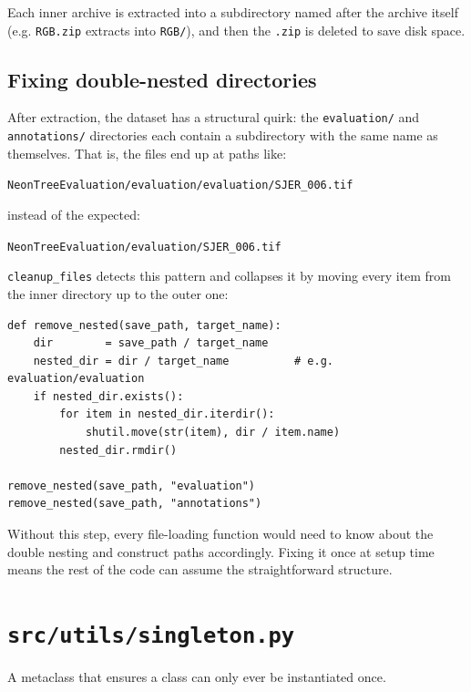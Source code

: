 \documentclass[11pt, a4paper]{article}
\newenvironment{filebox}[1]{%
  \begin{tcolorbox}[
    colback=filebg, colframe=fileframe,
    fonttitle=\bfseries\ttfamily, title=#1,
    breakable, enhanced
  ]
}{%
  \end{tcolorbox}
}
\begin{document}
Each inner archive is extracted into a subdirectory named after the archive
itself (e.g. \texttt{RGB.zip} extracts into \texttt{RGB/}), and then the
\texttt{.zip} is deleted to save disk space.

\subsection{Fixing double-nested directories}

After extraction, the dataset has a structural quirk: the
\texttt{evaluation/} and \texttt{annotations/} directories each contain a
subdirectory with the same name as themselves. That is, the files end up at
paths like:

\begin{center}
  \texttt{NeonTreeEvaluation/evaluation/evaluation/SJER\_006.tif}
\end{center}

instead of the expected:

\begin{center}
  \texttt{NeonTreeEvaluation/evaluation/SJER\_006.tif}
\end{center}

\texttt{cleanup\_files} detects this pattern and collapses it by moving every
item from the inner directory up to the outer one:

\begin{lstlisting}
def remove_nested(save_path, target_name):
    dir        = save_path / target_name
    nested_dir = dir / target_name          # e.g. evaluation/evaluation
    if nested_dir.exists():
        for item in nested_dir.iterdir():
            shutil.move(str(item), dir / item.name)
        nested_dir.rmdir()

remove_nested(save_path, "evaluation")
remove_nested(save_path, "annotations")
\end{lstlisting}

Without this step, every file-loading function would need to know about the
double nesting and construct paths accordingly. Fixing it once at setup time
means the rest of the code can assume the straightforward structure.

\section{\texttt{src/utils/singleton.py}}

\begin{filebox}{src/utils/singleton.py}
  A metaclass that ensures a class can only ever be instantiated once.
\end{filebox}
\end{document}
